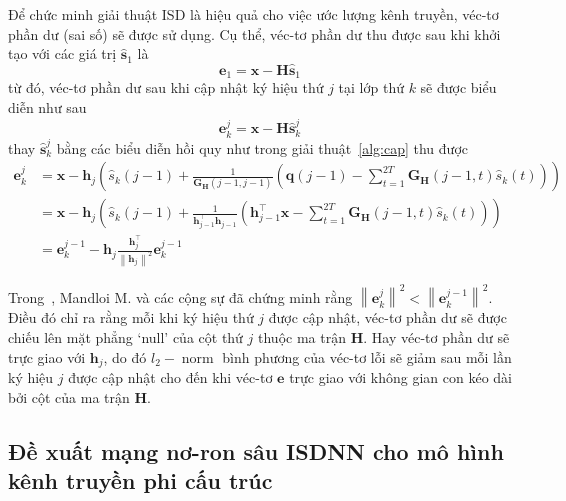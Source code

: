 Để chức minh giải thuật ISD là hiệu quả cho việc ước lượng kênh truyền, véc-tơ phần dư (sai số) sẽ được sử dụng. Cụ thể, véc-tơ phần dư thu được sau khi khởi tạo với các giá trị $\hat{\mathbf{s}}_1$ là
\begin{equation}
    \mathbf{e}_1 = \mathbf{x} - \mathbf{H} \hat{\mathbf{s}}_1
\end{equation}
từ đó, véc-tơ phần dư sau khi cập nhật ký hiệu thứ $j$ tại lớp thứ $k$ sẽ được biểu diễn như sau
\begin{equation}
    \mathbf{e}_k^{j}=\mathbf{x}-\mathbf{H} \hat{\mathbf{s}}_k^j
\end{equation}
thay $\hat{\mathbf{s}}_k^j$ bằng các biểu diễn hồi quy như trong giải thuật~\ref{alg:cap} thu được
\begin{equation}
\label{eq:eupdate}
\begin{aligned}
    \mathbf{e}_k^{j} & =\mathbf{x}-\mathbf{h}_j\left(\hat{s}_k(j-1)+\frac{1}{\mathbf{G}_\mathbf{H}(j-1, j-1)}\left(\mathbf{q}(j-1)-\sum_{t=1}^{2T} \mathbf{G}_\mathbf{H}(j-1, t) \hat{s}_k(t)\right)\right) \\
    & =\mathbf{x}-\mathbf{h}_j\left(\hat{s}_k(j-1)+\frac{1}{\mathbf{h}^\top_{j-1} \mathbf{h}_{j-1}}\left(\mathbf{h}_{j-1}^\top \mathbf{x}-\sum_{t=1}^{2T} \mathbf{G}_\mathbf{H}(j-1, t) \hat{s}_k(t)\right)\right) \\
    & =\mathbf{e}_k^{j-1}-\mathbf{h}_{j} \frac{\mathbf{h}_j^\top}{\left\|\mathbf{h}_j\right\|^2} \mathbf{e}_k^{j-1}
    \end{aligned}
\end{equation}

Trong~\cite{Mandloi2017}, Mandloi M. và các cộng sự đã chứng minh rằng $\left\|\mathbf{e}_k^{j}\right\|^2<\left\|\mathbf{e}_k^{j-1}\right\|^2$. Điều đó chỉ ra rằng mỗi khi ký hiệu thứ $j$ được cập nhật, véc-tơ phần dư sẽ được chiếu lên mặt phẳng `null' của cột thứ $j$ thuộc ma trận $\mathbf{H}$. Hay véc-tơ phần dư sẽ trực giao với $\mathbf{h}_j$, do đó $l_2-\operatorname{norm}$ bình phương của véc-tơ lỗi sẽ giảm sau mỗi lần ký hiệu $j$ được cập nhật cho đến khi véc-tơ $\mathbf{e}$ trực giao với không gian con kéo dài bởi cột của ma trận $\mathbf{H}$.

\subsection{Đề xuất mạng nơ-ron sâu ISDNN cho mô hình kênh truyền phi cấu trúc}
\label{sec:ISNN_nonstructured}

